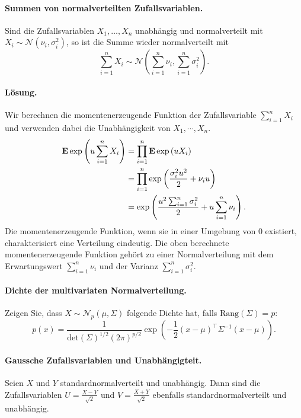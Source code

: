 \paragraph{Summen von normalverteilten Zufallsvariablen. }
Sind die Zufallsvariablen $X_1,\ldots,X_n$ unabhängig und normalverteilt
mit $X_i \sim \mathcal N (\nu_i, \sigma_i^2)$, so ist die Summe
wieder normalverteilt mit 
\begin{equation*}
    \sum_{i=1}^{n} X_i \sim 
    \mathcal N \left( \sum_{i=1}^{n} \nu_i, \sum_{i=1}^{n} \sigma_i^2 \right). 
\end{equation*} %

\paragraph*{Lösung. }
Wir berechnen die momentenerzeugende Funktion der Zufallsvariable $\sum_{i=1}^{n} X_i$
und verwenden dabei die Unabhängigkeit von $X_1, \cdots, X_n$.
\begin{align*}
    \mathbf{E} \exp \left( u \sum_{i=1}^{n} X_i \right) 
    &= \prod_{i=1}^{n} \mathbf{E} \exp \left( u X_i \right) \\
    &= \prod_{i=1}^n \exp \left( \frac{\sigma_i^2 u^2 }{2} + \nu_i u \right) \\
    &= \exp \left( \frac{ u^2 \sum_{i=1}^{n} \sigma_i^2 }{2} + u \sum_{i=1}^{n} \nu_i \right).
\end{align*}
Die momentenerzeugende Funktion, wenn sie in einer Umgebung von $0$ existiert, 
charakterisiert eine Verteilung eindeutig. Die oben berechnete momentenerzeugende Funktion
gehört zu einer Normalverteilung mit dem Erwartungswert $\sum_{i=1}^{n} \nu_i$ und
der Varianz $\sum_{i=1}^{n} \sigma^2_i$. 


\paragraph{Dichte der multivariaten Normalverteilung. } Zeigen Sie, dass 
$X \sim \mathcal N_p\left( \mu, \Sigma \right) $ folgende Dichte hat, falls 
$\textrm{Rang}(\Sigma)=p$: 
\begin{equation*}
    p(x) = \frac{1}{ \textrm{det}(\Sigma)^{1/2} (2\pi)^{p/2}} \exp\left( - \frac{1}{2} (x  - \mu)^\top \Sigma^{-1} (x - \mu) \right).
\end{equation*} %


\paragraph{Gaussche Zufallsvariablen und Unabhängigteit. } Seien $X$ und $Y$
standardnormalverteilt und unabhängig. Dann sind die Zufallsvariablen $U =
\frac{X-Y}{\sqrt{2}}$ und $V=\frac{X+Y}{\sqrt{2}}$ ebenfalls standardnormalverteilt 
und unabhängig. 

